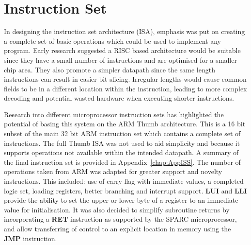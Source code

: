 
\chapter{Instruction Set}\label{ch:is}

In designing the instruction set architecture (ISA), emphasis was put on creating a complete set of basic operations which could be used to implement any program. 
Early research suggested a RISC based architecture would be suitable since they have a small number of instructions and are optimised for a smaller chip area. 
They also promote a simpler datapath since the same length instructions can result in easier bit slicing. 
Irregular lengths would cause common fields to be in a different location within the instruction, leading to more complex decoding and potential wasted hardware when executing shorter instructions. 

Research into different microprocessor instruction sets has highlighted the potential of basing this system on the ARM Thumb architecture.
This is a 16 bit subset of the main 32 bit ARM instruction set which contains a complete set of instructions. 
The full Thumb ISA was not used to aid simplicity and because it supports operations not available within the intended datapath. 
A summary of the final instruction set is provided in Appendix~\ref{chap:AppISS}. 
The number of operations taken from ARM was adapted for greater support and novelty instructions.
This included: use of carry flag with immediate values, a completed logic set, loading registers, better branching and interrupt support. 
\textbf{LUI} and \textbf{LLI} provide the ability to set the upper or lower byte of a register to an immediate value for initialisation. 
It was also decided to simplify subroutine returns by incorporating a \textbf{RET} instruction as supported by the SPARC microprocessor, and allow transferring of control to an explicit location in memory using the \textbf{JMP} instruction.


